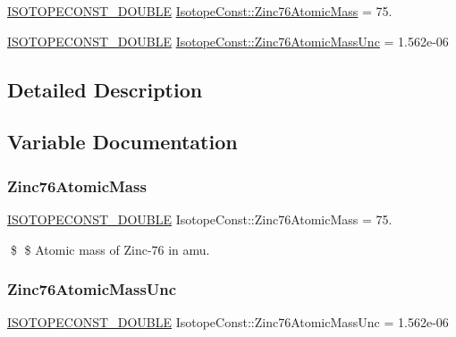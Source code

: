 \begin{DoxyCompactItemize}
\item 
\mbox{\hyperlink{group___isotope_const-_macros_ga8f45a7272ce02c0b4c65c44636ed719a}{I\+S\+O\+T\+O\+P\+E\+C\+O\+N\+S\+T\+\_\+\+D\+O\+U\+B\+LE}} \mbox{\hyperlink{group___isotope_const-_zinc-_zn76_gad6305d7c291aa0c7f25a82e8e37958c7}{Isotope\+Const\+::\+Zinc76\+Atomic\+Mass}} = 75.
\item 
\mbox{\hyperlink{group___isotope_const-_macros_ga8f45a7272ce02c0b4c65c44636ed719a}{I\+S\+O\+T\+O\+P\+E\+C\+O\+N\+S\+T\+\_\+\+D\+O\+U\+B\+LE}} \mbox{\hyperlink{group___isotope_const-_zinc-_zn76_gadda3ab06bc1466e4d00f4e2c228a6a2d}{Isotope\+Const\+::\+Zinc76\+Atomic\+Mass\+Unc}} = 1.\+562e-\/06
\end{DoxyCompactItemize}


\subsection{Detailed Description}


\subsection{Variable Documentation}
\mbox{\label{group___isotope_const-_zinc-_zn76_gad6305d7c291aa0c7f25a82e8e37958c7}} 
\subsubsection{\texorpdfstring{Zinc76\+Atomic\+Mass}{Zinc76AtomicMass}}
{\footnotesize\ttfamily \mbox{\hyperlink{group___isotope_const-_macros_ga8f45a7272ce02c0b4c65c44636ed719a}{I\+S\+O\+T\+O\+P\+E\+C\+O\+N\+S\+T\+\_\+\+D\+O\+U\+B\+LE}} Isotope\+Const\+::\+Zinc76\+Atomic\+Mass = 75.}

\$ \$ Atomic mass of Zinc-\/76 in amu. \mbox{\label{group___isotope_const-_zinc-_zn76_gadda3ab06bc1466e4d00f4e2c228a6a2d}} 
\subsubsection{\texorpdfstring{Zinc76\+Atomic\+Mass\+Unc}{Zinc76AtomicMassUnc}}
{\footnotesize\ttfamily \mbox{\hyperlink{group___isotope_const-_macros_ga8f45a7272ce02c0b4c65c44636ed719a}{I\+S\+O\+T\+O\+P\+E\+C\+O\+N\+S\+T\+\_\+\+D\+O\+U\+B\+LE}} Isotope\+Const\+::\+Zinc76\+Atomic\+Mass\+Unc = 1.\+562e-\/06}

